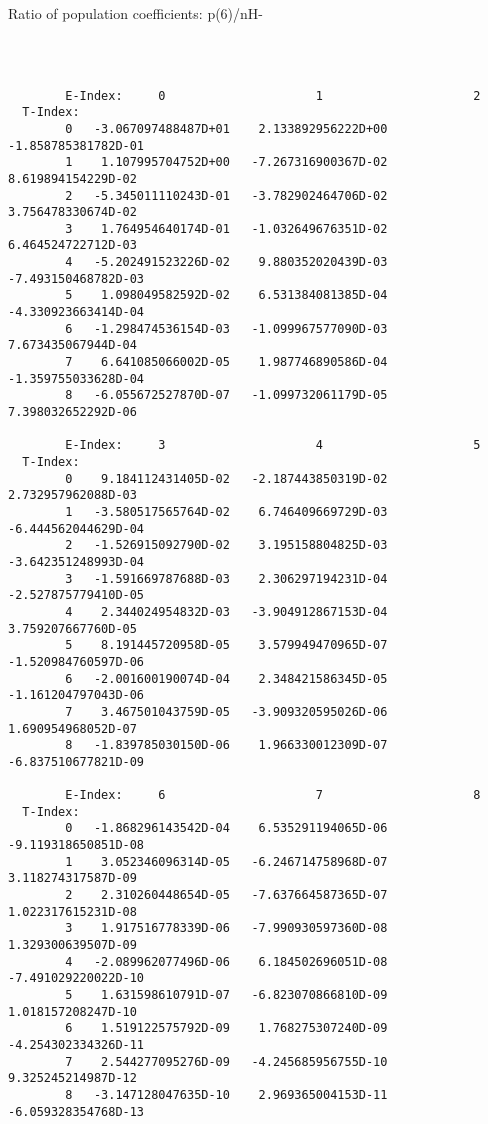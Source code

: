 \documentclass[12pt,dvipdfmx]{article}
\begin{document}
{ Ratio of population coefficients: p(6)/nH-



\begin{small}\begin{verbatim}



        E-Index:     0                     1                     2
  T-Index:
        0   -3.067097488487D+01    2.133892956222D+00   -1.858785381782D-01
        1    1.107995704752D+00   -7.267316900367D-02    8.619894154229D-02
        2   -5.345011110243D-01   -3.782902464706D-02    3.756478330674D-02
        3    1.764954640174D-01   -1.032649676351D-02    6.464524722712D-03
        4   -5.202491523226D-02    9.880352020439D-03   -7.493150468782D-03
        5    1.098049582592D-02    6.531384081385D-04   -4.330923663414D-04
        6   -1.298474536154D-03   -1.099967577090D-03    7.673435067944D-04
        7    6.641085066002D-05    1.987746890586D-04   -1.359755033628D-04
        8   -6.055672527870D-07   -1.099732061179D-05    7.398032652292D-06

        E-Index:     3                     4                     5
  T-Index:
        0    9.184112431405D-02   -2.187443850319D-02    2.732957962088D-03
        1   -3.580517565764D-02    6.746409669729D-03   -6.444562044629D-04
        2   -1.526915092790D-02    3.195158804825D-03   -3.642351248993D-04
        3   -1.591669787688D-03    2.306297194231D-04   -2.527875779410D-05
        4    2.344024954832D-03   -3.904912867153D-04    3.759207667760D-05
        5    8.191445720958D-05    3.579949470965D-07   -1.520984760597D-06
        6   -2.001600190074D-04    2.348421586345D-05   -1.161204797043D-06
        7    3.467501043759D-05   -3.909320595026D-06    1.690954968052D-07
        8   -1.839785030150D-06    1.966330012309D-07   -6.837510677821D-09

        E-Index:     6                     7                     8
  T-Index:
        0   -1.868296143542D-04    6.535291194065D-06   -9.119318650851D-08
        1    3.052346096314D-05   -6.246714758968D-07    3.118274317587D-09
        2    2.310260448654D-05   -7.637664587365D-07    1.022317615231D-08
        3    1.917516778339D-06   -7.990930597360D-08    1.329300639507D-09
        4   -2.089962077496D-06    6.184502696051D-08   -7.491029220022D-10
        5    1.631598610791D-07   -6.823070866810D-09    1.018157208247D-10
        6    1.519122575792D-09    1.768275307240D-09   -4.254302334326D-11
        7    2.544277095276D-09   -4.245685956755D-10    9.325245214987D-12
        8   -3.147128047635D-10    2.969365004153D-11   -6.059328354768D-13


\end{verbatim}
\end{small}}
\end{document}
